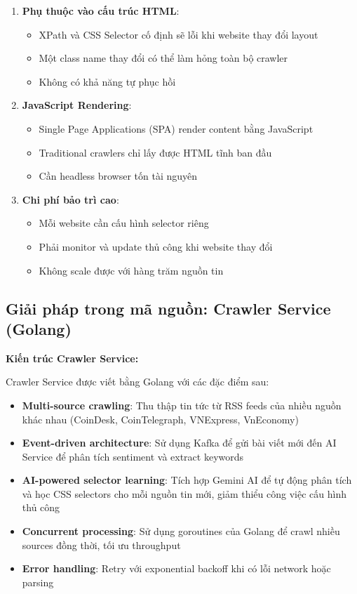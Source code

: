\begin{enumerate}
    \item \textbf{Phụ thuộc vào cấu trúc HTML}:
    \begin{itemize}
        \item XPath và CSS Selector cố định sẽ lỗi khi website thay đổi layout
        \item Một class name thay đổi có thể làm hỏng toàn bộ crawler
        \item Không có khả năng tự phục hồi
    \end{itemize}
    
    \item \textbf{JavaScript Rendering}:
    \begin{itemize}
        \item Single Page Applications (SPA) render content bằng JavaScript
        \item Traditional crawlers chỉ lấy được HTML tĩnh ban đầu
        \item Cần headless browser tốn tài nguyên
    \end{itemize}
    
    \item \textbf{Chi phí bảo trì cao}:
    \begin{itemize}
        \item Mỗi website cần cấu hình selector riêng
        \item Phải monitor và update thủ công khi website thay đổi
        \item Không scale được với hàng trăm nguồn tin
    \end{itemize}
\end{enumerate}

\subsection{Giải pháp trong mã nguồn: Crawler Service (Golang)}

\noindent\textbf{Kiến trúc Crawler Service:}

Crawler Service được viết bằng Golang với các đặc điểm sau:
\begin{itemize}
    \item \textbf{Multi-source crawling}: Thu thập tin tức từ RSS feeds của nhiều nguồn khác nhau (CoinDesk, CoinTelegraph, VNExpress, VnEconomy)
    
    \item \textbf{Event-driven architecture}: Sử dụng Kafka để gửi bài viết mới đến AI Service để phân tích sentiment và extract keywords
    
    \item \textbf{AI-powered selector learning}: Tích hợp Gemini AI để tự động phân tích và học CSS selectors cho mỗi nguồn tin mới, giảm thiểu công việc cấu hình thủ công
    
    \item \textbf{Concurrent processing}: Sử dụng goroutines của Golang để crawl nhiều sources đồng thời, tối ưu throughput
    
    \item \textbf{Error handling}: Retry với exponential backoff khi có lỗi network hoặc parsing
\end{itemize}

